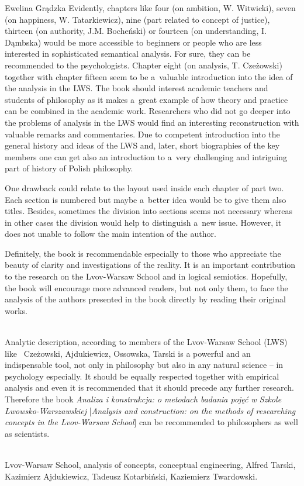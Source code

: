 \begin{newrevengenv}{Ewelina Grądzka}
Evidently, chapters like four (on ambition, W. Witwicki), seven (on happiness, W. Tatarkiewicz), nine (part related to concept of justice), thirteen (on authority, J.M. Bocheński) or fourteen (on understanding, I. Dąmbska) would be more accessible to beginners or people who are less interested in sophisticated semantical analysis. For sure, they can be recommended to the psychologists. Chapter eight (on analysis, T. Czeżowski) together with chapter fifteen seem to be a~valuable introduction into the idea of the analysis in the LWS. The book should interest academic teachers and students of philosophy as it makes a~great example of how theory and practice can be combined in the academic work. Researchers who did not go deeper into the problems of analysis in the LWS would find an interesting reconstruction with valuable remarks and commentaries. Due to competent introduction into the general history and ideas of the LWS and, later, short biographies of the key members one can get also an introduction to a~very challenging and intriguing part of history of Polish philosophy.

One drawback could relate to the layout used inside each chapter of part two. Each section is numbered but maybe a~better idea would be to give them also titles. Besides, sometimes the division into sections seems not necessary whereas in other cases the division would help to distinguish a~new issue. However, it does not unable to follow the main intention of the author.

Definitely, the book is recommendable especially to those who appreciate the beauty of clarity and investigations of the reality. It is an important contribution to the research on the Lvov-Warsaw School and in logical semiotics. Hopefully, the book will encourage more advanced readers, but not only them, to face the analysis of the authors presented in the book directly by reading their original works.







\vspace{15mm}%
{}\\
{Analytic description, according to members of the Lvov-Warsaw School (LWS) like  Czeżowski, Ajdukiewicz, Ossowska, Tarski is a powerful and an indispensable tool, not only in philosophy but also in any natural science – in psychology especially. It should be equally respected together with empirical analysis and even it is recommended that it should precede any further research. Therefore the book \textit{Analiza i konstrukcja: o metodach badania pojęć w Szkole Lwowsko-Warszawskiej} [\textit{Analysis and construction: on the methods of researching concepts in the Lvov-Warsaw School}] can be recommended to philosophers as well as scientists.}\par%
\vspace{2mm}%
{}\\
{Lvov-Warsaw School, analysis of concepts, conceptual engineering, Alfred Tarski, Kazimierz Ajdukiewicz, Tadeusz Kotarbiński, Kaziemierz Twardowski.}%



\end{newrevengenv}

